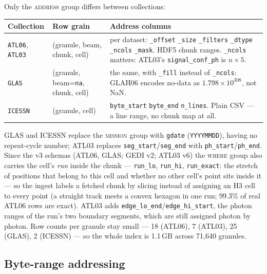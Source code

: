 \documentclass[11pt,a4paper]{article}
\newcommand{\code}[1]{\texttt{\small #1}}
\newcommand{\col}[1]{\texttt{\footnotesize #1}}
\begin{document}
\vspace{2mm}
\noindent
Only the \textsc{address} group differs between collections:

\begin{center}\small
\begin{tabular}{@{}p{20mm}p{32mm}p{72mm}@{}}
\toprule
\textbf{Collection} & \textbf{Row grain} & \textbf{Address columns} \\
\midrule
\code{ATL06}, \code{ATL03} & (granule, beam, chunk, cell) &
  per dataset: \col{\_offset} \col{\_size} \col{\_filters} \col{\_dtype} \col{\_ncols} \col{\_mask}.
  HDF5 chunk ranges. \col{\_ncols} matters: ATL03's \col{signal\_conf\_ph} is $n\times5$. \\
\addlinespace[2pt]
\code{GLAS} & (granule, beam=\code{na}, chunk, cell) &
  the same, with \col{\_fill} instead of \col{\_ncols}: GLAH06 encodes no-data as
  $1.798\times10^{308}$, not NaN. \\
\addlinespace[2pt]
\code{ICESSN} & (granule, cell) &
  \col{byte\_start} \col{byte\_end} \col{n\_lines}. Plain CSV --- a line range, no chunk map at all. \\
\bottomrule
\end{tabular}
\end{center}

\noindent
GLAS and ICESSN replace the \textsc{mission} group with \col{gdate} (\code{YYYYMMDD}), having no
repeat-cycle number; ATL03 replaces \col{seg\_start}/\col{seg\_end} with \col{ph\_start}/\col{ph\_end}.
Since the v3 schemas (ATL06, GLAS; GEDI v2; ATL03 v6) the \textsc{where} group also carries the cell's
\emph{run} inside the chunk --- \col{run\_lo}, \col{run\_hi}, \col{run\_exact}: the stretch of positions that
belong to this cell and whether no other cell's point sits inside it --- so the ingest labels a fetched chunk by
slicing instead of assigning an H3 cell to every point (a straight track meets a convex hexagon in one run; 99.3\%
of real ATL06 rows are exact). ATL03 adds \col{edge\_lo\_end}/\col{edge\_hi\_start}, the photon ranges of the run's
two boundary segments, which are still assigned photon by photon.
Row counts per granule stay small --- 18 (ATL06), 7 (ATL03), 25 (GLAS), 2 (ICESSN) --- so the whole index is
1.1\,GB across 71{,}640 granules.

\subsection{Byte-range addressing}
\label{sec:bytes}
\end{document}
